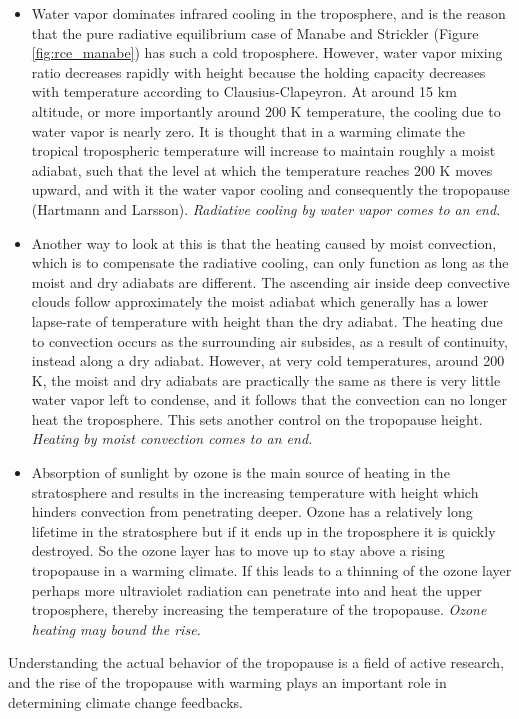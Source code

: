 \documentclass[12pt]{book}
\begin{document}
\begin{itemize}
\item
Water vapor dominates infrared cooling in the troposphere, and is the reason that the pure radiative equilibrium case of Manabe and Strickler (Figure \ref{fig:rce_manabe}) has such a cold troposphere. However, water vapor mixing ratio decreases rapidly with height because the holding capacity decreases with temperature according to Clausius-Clapeyron. At around 15 km altitude, or more importantly around 200 K temperature, the cooling due to water vapor is nearly zero. It is thought that in a warming climate the tropical tropospheric temperature will increase to maintain roughly a moist adiabat, such that the level at which the temperature reaches 200 K moves upward, and with it the water vapor cooling and consequently the tropopause (Hartmann and Larsson\cite{Hartmann2002}). {\em Radiative cooling by water vapor comes to an end.}
\item
Another way to look at this is that the heating caused by moist convection, which is to compensate the radiative cooling, can only function as long as the moist and dry adiabats are different. The ascending air inside deep convective clouds follow approximately the moist adiabat which generally has a lower lapse-rate of temperature with height than the dry adiabat. The heating due to convection occurs as the surrounding air subsides, as a result of continuity, instead along a dry adiabat. However, at very cold temperatures, around 200 K, the moist and dry adiabats are practically the same as there is very little water vapor left to condense, and it follows that the convection can no longer heat the troposphere. This sets another control on the tropopause height. {\em Heating by moist convection comes to an end.}
\item
Absorption of sunlight by ozone is the main source of heating in the stratosphere and results in the increasing temperature with height which hinders convection from penetrating deeper. Ozone has a relatively long lifetime in the stratosphere but if it ends up in the troposphere it is quickly destroyed. So the ozone layer has to move up to stay above a rising tropopause in a warming climate. If this leads to a thinning of the ozone layer perhaps more ultraviolet radiation can penetrate into and heat the upper troposphere, thereby increasing the temperature of the tropopause. {\em Ozone heating may bound the rise.}
\end{itemize}
Understanding the actual behavior of the tropopause is a field of active research, and the rise of the tropopause with warming plays an important role in determining climate change feedbacks. 
\end{document}
